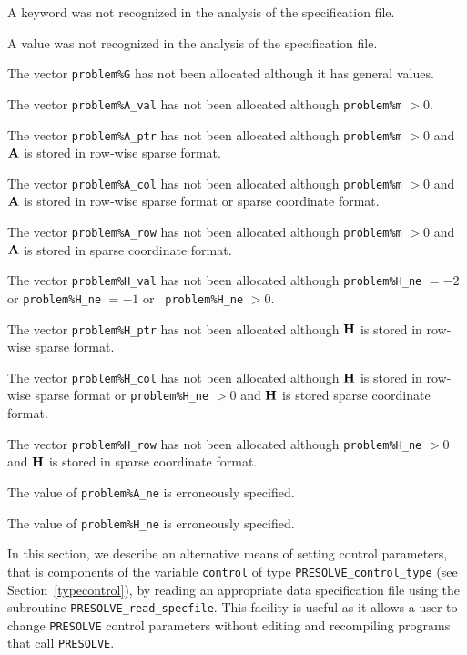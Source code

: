 \documentclass{galahad}
\newcommand{\packagename}{PRESOLVE}
\begin{document}
\begin{description}
 A keyword was not recognized in the analysis of the specification
file.

 A value was not recognized in the analysis of the specification file.

 The vector {\tt problem\%G} has not been allocated although it
has general values.

 The vector {\tt problem\%A\_val} has not been allocated although
{\tt problem\%m} $> 0$.

 The vector {\tt problem\%A\_ptr} has not been allocated although
{\tt problem\%m} $> 0$ and ${\mathbf{A}}$ is stored in row-wise sparse format.

 The vector {\tt problem\%A\_col} has not been allocated although
{\tt problem\%m} $> 0$ and ${\mathbf{A}}$ is stored in row-wise sparse format
or sparse coordinate format.

 The vector {\tt problem\%A\_row} has not been allocated although
{\tt problem\%m} $> 0$ and ${\mathbf{A}}$ is stored in sparse coordinate format.

 The vector {\tt problem\%H\_val} has not been allocated although
{\tt problem\%H\_ne} $= -2$ or {\tt problem\%H\_ne} $= -1$ or {\tt
problem\%H\_ne} $> 0$.

 The vector {\tt problem\%H\_ptr} has not been allocated although
${\mathbf{H}}$ is stored in row-wise sparse format.

 The vector {\tt problem\%H\_col} has not been allocated although
${\mathbf{H}}$ is stored in row-wise sparse format or {\tt problem\%H\_ne} $> 0$ and
${\mathbf{H}}$ is stored sparse coordinate format.

 The vector {\tt problem\%H\_row} has not been allocated although
{\tt problem\%H\_ne} $> 0$ and ${\mathbf{H}}$ is stored in sparse coordinate format.

 The value of {\tt problem\%A\_ne} is erroneously specified.

 The value of {\tt problem\%H\_ne} is erroneously specified.

\end{description}


\galfeatures
\noindent In this section, we describe an alternative means of setting
control parameters, that is components of the variable {\tt control} of type
{\tt \packagename\_control\_type}
(see Section~\ref{typecontrol}),
by reading an appropriate data specification file using the
subroutine {\tt \packagename\_read\_specfile}. This facility
is useful as it allows a user to change  {\tt \packagename} control parameters
without editing and recompiling programs that call {\tt \packagename}.
\end{document}
